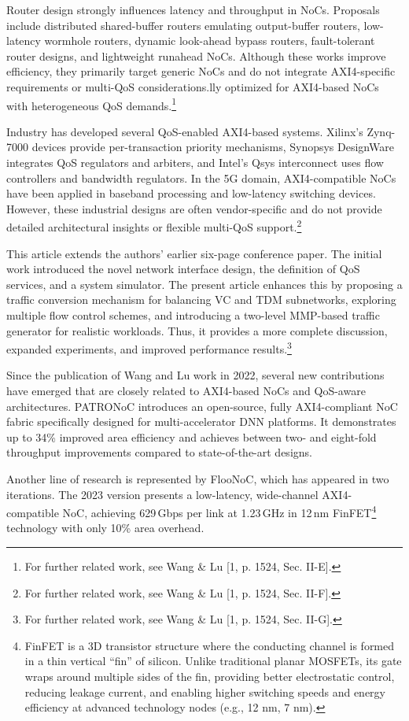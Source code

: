 Router design strongly influences latency and throughput in NoCs. Proposals include distributed shared-buffer routers emulating output-buffer routers, low-latency wormhole routers, dynamic look-ahead bypass routers, fault-tolerant router designs, and lightweight runahead NoCs. Although these works improve efficiency, they primarily target generic NoCs and do not integrate AXI4-specific requirements or multi-QoS considerations.lly optimized for AXI4-based NoCs with heterogeneous QoS demands.\footnote{For further related work, see Wang \& Lu [1, p. 1524, Sec. II-E].} 


Industry has developed several QoS-enabled AXI4-based systems. Xilinx’s Zynq-7000 devices provide per-transaction priority mechanisms, Synopsys DesignWare integrates QoS regulators and arbiters, and Intel’s Qsys interconnect uses flow controllers and bandwidth regulators. In the 5G domain, AXI4-compatible NoCs have been applied in baseband processing and low-latency switching devices. However, these industrial designs are often vendor-specific and do not provide detailed architectural insights or flexible multi-QoS support.\footnote{For further related work, see Wang \& Lu [1, p. 1524, Sec. II-F].}


This article extends the authors’ earlier six-page conference paper. The initial work introduced the novel network interface design, the definition of QoS services, and a system simulator. The present article enhances this by proposing a traffic conversion mechanism for balancing \ac{VC} and \ac{TDM} subnetworks, exploring multiple flow control schemes, and introducing a two-level \ac{MMP}-based traffic generator for realistic workloads. Thus, it provides a more complete discussion, expanded experiments, and improved performance results.\footnote{For further related work, see Wang \& Lu [1, p. 1524, Sec. II-G].} 


Since the publication of Wang and Lu work in 2022, several new contributions have emerged that are closely related to AXI4-based NoCs and QoS-aware architectures. PATRONoC introduces an open-source, fully AXI4-compliant NoC fabric specifically designed for multi-accelerator \ac{DNN} platforms. It demonstrates up to 34\% improved area efficiency and achieves between two- and eight-fold throughput improvements compared to state-of-the-art designs.\cite{jain_patronoc_2023} 

Another line of research is represented by FlooNoC, which has appeared in two iterations. The 2023 version presents a low-latency, wide-channel AXI4-compatible NoC, achieving 629\,Gbps per link at 1.23\,GHz in 12\,nm \ac{FinFET}\footnote{FinFET is a 3D transistor structure where the conducting channel is formed in a thin vertical “fin” of silicon. Unlike traditional planar MOSFETs, its gate wraps around multiple sides of the fin, providing better electrostatic control, reducing leakage current, and enabling higher switching speeds and energy efficiency at advanced technology nodes (e.g., 12 nm, 7 nm).} technology with only 10\% area overhead.\cite{fischer_floonoc_2023} 

